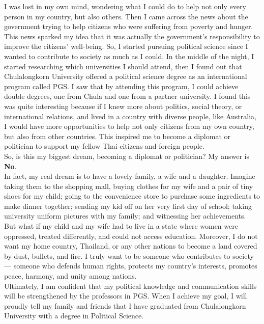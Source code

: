\documentclass[11pt]{book}
\begin{document}
I was lost in my own mind, wondering what I could do to help not only every person in my country, but also others. Then I came across the news about the government trying to help citizens who were suffering from poverty and hunger.  This news sparked my idea that it was actually the government’s responsibility to improve the citizens' well-being. So, I started pursuing political science since I wanted to contribute to society as much as I could. In the middle of the night, I started researching which universities I should attend, then I found out that Chulalongkorn University offered a political science degree as an international program called PGS. I saw that by attending this program, I could achieve double degrees, one from Chula and one from a partner university. I found this was quite interesting because if I knew more about politics, social theory, or international relations, and lived in a country with diverse people, like Australia, I would have more opportunities to help not only citizens from my own country, but also from other countries. This inspired me to become a diplomat or politician to support my fellow Thai citizens and foreign people.\\

So, is this my biggest dream, becoming a diplomat or politician? 
My answer is \textbf{No}.\\

In fact, my real dream is to have a lovely family, a wife and a daughter. Imagine taking them to the shopping mall, buying clothes for my wife and a pair of tiny shoes for my child; going to the convenience store to purchase some ingredients to make dinner together; sending my kid off on her very first day of school; taking university uniform pictures with my family; and witnessing her achievements.\\

 But what if my child and my wife had to live in a state where women were oppressed, treated differently, and could not access education. Moreover, I do not want my home country, Thailand, or any other nations to become a land covered by dust, bullets, and fire. I truly want to be someone who contributes to society — someone who defends human rights, protects my country's interests, promotes peace, harmony, and unity among nations.\\

Ultimately, I am confident that my political knowledge and communication skills will be strengthened by the professors in PGS. When I achieve my goal, I will proudly tell my family and friends that I have graduated from Chulalongkorn University with a degree in Political Science.
\end{document}

